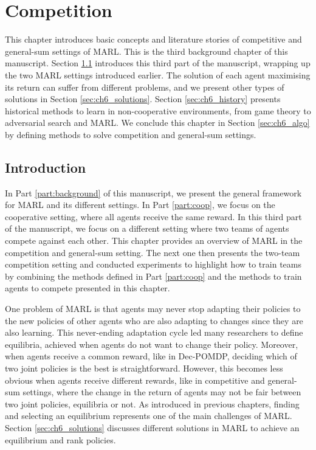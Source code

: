 \chapter{Competition}\label{ch:competition}
\begin{chapter_outline}

This chapter introduces basic concepts and literature stories of competitive and general-sum settings of MARL.
This is the third background chapter of this manuscript.
Section \ref{sec:ch6_intro} introduces this third part of the manuscript, wrapping up the two MARL settings introduced earlier.
The solution of each agent maximising its return can suffer from different problems, and we present other types of solutions in Section \ref{sec:ch6_solutions}.
Section \ref{sec:ch6_history} presents historical methods to learn in non-cooperative environments, from game theory to adversarial search and MARL.
We conclude this chapter in Section \ref{sec:ch6_algo} by defining methods to solve competition and general-sum settings.

\end{chapter_outline}

\section{Introduction}\label{sec:ch6_intro}
In Part \ref{part:background} of this manuscript, we present the general framework for MARL and its different settings.
In Part \ref{part:coop}, we focus on the cooperative setting, where all agents receive the same reward.
In this third part of the manuscript, we focus on a different setting where two teams of agents compete against each other.
This chapter provides an overview of MARL in the competition and general-sum setting.
The next one then presents the two-team competition setting and conducted experiments to highlight how to train teams by combining the methods defined in Part \ref{part:coop} and the methods to train agents to compete presented in this chapter.

One problem of MARL is that agents may never stop adapting their policies to the new policies of other agents who are also adapting to changes since they are also learning.
This never-ending adaptation cycle led many researchers to define equilibria, achieved when agents do not want to change their policy.
Moreover, when agents receive a common reward, like in Dec-POMDP, deciding which of two joint policies is the best is straightforward.
However, this becomes less obvious when agents receive different rewards, like in competitive and general-sum settings, where the change in the return of agents may not be fair between two joint policies, equilibria or not.
As introduced in previous chapters, finding and selecting an equilibrium represents one of the main challenges of MARL.
Section \ref{sec:ch6_solutions} discusses different solutions in MARL to achieve an equilibrium and rank policies.

